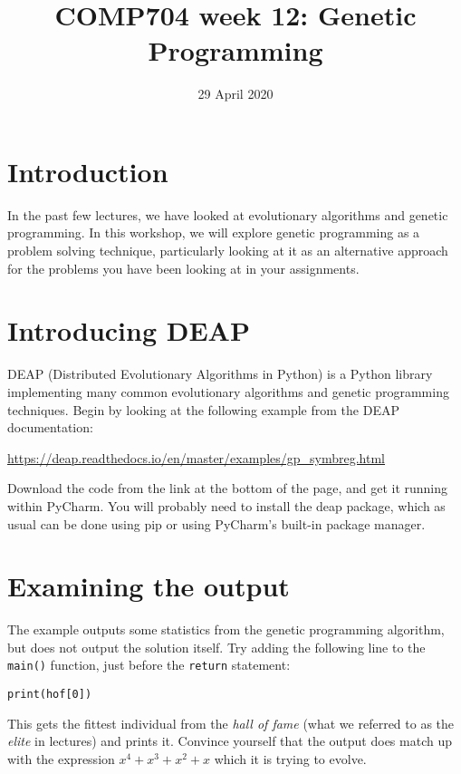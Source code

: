 \documentclass{article}
\title{COMP704 week 12: Genetic Programming}
\date{29 April 2020}
\begin{document}
\maketitle

\section*{Introduction}

In the past few lectures, we have looked at evolutionary algorithms and genetic programming. In this workshop, we will explore genetic programming as a problem solving technique, particularly looking at it as an alternative approach for the problems you have been looking at in your assignments.

\section*{Introducing DEAP}

DEAP (Distributed Evolutionary Algorithms in Python) is a Python library implementing many common evolutionary algorithms and genetic programming techniques. Begin by looking at the following example from the DEAP documentation:

\begin{center}
    \url{https://deap.readthedocs.io/en/master/examples/gp_symbreg.html}
\end{center}

Download the code from the link at the bottom of the page, and get it running within PyCharm. You will probably need to install the deap package, which as usual can be done using pip or using PyCharm’s built-in package manager.

\section*{Examining the output}

The example outputs some statistics from the genetic programming algorithm, but does not output the solution itself. Try adding the following line to the \lstinline{main()} function, just before the \lstinline{return} statement:

\begin{lstlisting}[firstnumber=94]
    print(hof[0])
\end{lstlisting}

This gets the fittest individual from the \emph{hall of fame} (what we referred to as the \emph{elite} in lectures) and prints it.
Convince yourself that the output does match up with the expression $x^4 + x^3 + x^2 + x$ which it is trying to evolve.
\end{document}
